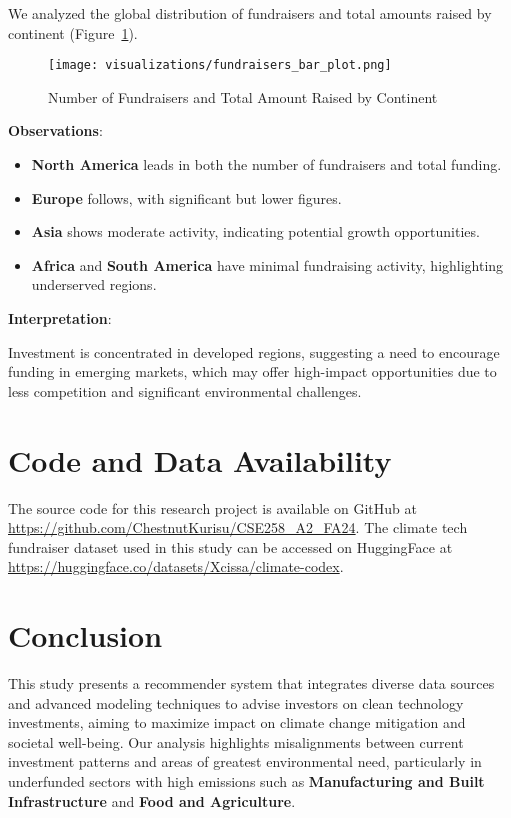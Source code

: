 \documentclass[sigconf]{acmart}
\begin{document}
We analyzed the global distribution of fundraisers and total amounts raised by continent (Figure~\ref{fig:fundraisers_bar}).

\begin{figure}[htpb]
    \centering
    \texttt{[image: visualizations/fundraisers\_bar\_plot.png]}
    \caption{Number of Fundraisers and Total Amount Raised by Continent}
    \label{fig:fundraisers_bar}
\end{figure}

\textbf{Observations}:

\begin{itemize}
    \item \textbf{North America} leads in both the number of fundraisers and total funding.
    \item \textbf{Europe} follows, with significant but lower figures.
    \item \textbf{Asia} shows moderate activity, indicating potential growth opportunities.
    \item \textbf{Africa} and \textbf{South America} have minimal fundraising activity, highlighting underserved regions.
\end{itemize}

\textbf{Interpretation}:

Investment is concentrated in developed regions, suggesting a need to encourage funding in emerging markets, which may offer high-impact opportunities due to less competition and significant environmental challenges.

\section{Code and Data Availability}

The source code for this research project is available on GitHub at \url{https://github.com/ChestnutKurisu/CSE258_A2_FA24}. The climate tech fundraiser dataset used in this study can be accessed on HuggingFace at \url{https://huggingface.co/datasets/Xcissa/climate-codex}.

\section{Conclusion}

This study presents a recommender system that integrates diverse data sources and advanced modeling techniques to advise investors on clean technology investments, aiming to maximize impact on climate change mitigation and societal well-being. Our analysis highlights misalignments between current investment patterns and areas of greatest environmental need, particularly in underfunded sectors with high emissions such as \textbf{Manufacturing and Built Infrastructure} and \textbf{Food and Agriculture}.
\end{document}
